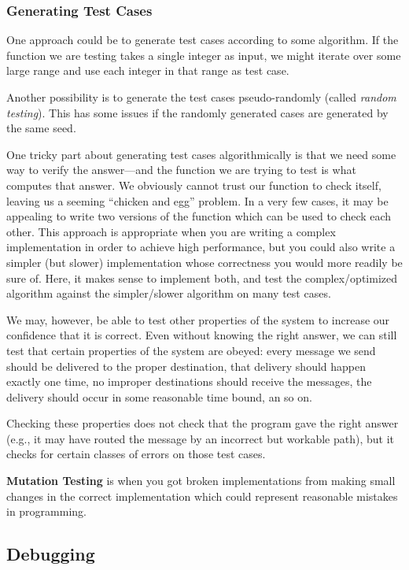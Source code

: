 \documentclass[11pt, a4paper]{article}
\begin{document}
\subsubsection{Generating Test Cases}%
\label{ssub:generating_test_cases}

One approach could be to generate test cases according to some algorithm. If the function we are testing takes a single integer as input, we might iterate over some large range and use each integer in that range as  test case. 

Another possibility is to generate the test cases pseudo-randomly (called \textit{random testing}). This has some issues if the randomly generated cases are generated by the same seed. 

One tricky part about generating test cases algorithmically is that we need some way to verify the answer—and the function we are trying to test is what computes that answer. We obviously cannot trust our function to check itself, leaving us a seeming “chicken and egg” problem. In a very few cases, it may be appealing to write two versions of the function which can be used to check each other. This approach is appropriate when you are writing a complex implementation in order to achieve high performance, but you could also write a simpler (but slower) implementation whose correctness you would more readily be sure of. Here, it makes sense to implement both, and test the complex/optimized algorithm against the simpler/slower algorithm on many test cases.

We may, however, be able to test other properties of the system to increase our confidence that it is correct. Even without knowing the right answer, we can still test that certain properties of the system are obeyed: every message we send should be delivered to the proper destination, that delivery should happen exactly one time, no improper destinations should receive the messages, the delivery should occur in some reasonable time bound, an so on.

Checking these properties does not check that the program gave the right answer (e.g., it may have routed the message by an incorrect but workable path), but it checks for certain classes of errors on those test cases.



\textbf{Mutation Testing} is when you got broken implementations from making small changes in the correct implementation which could represent reasonable mistakes in programming. 

\subsection{Debugging}%
\label{sub:debugging}
\end{document}
